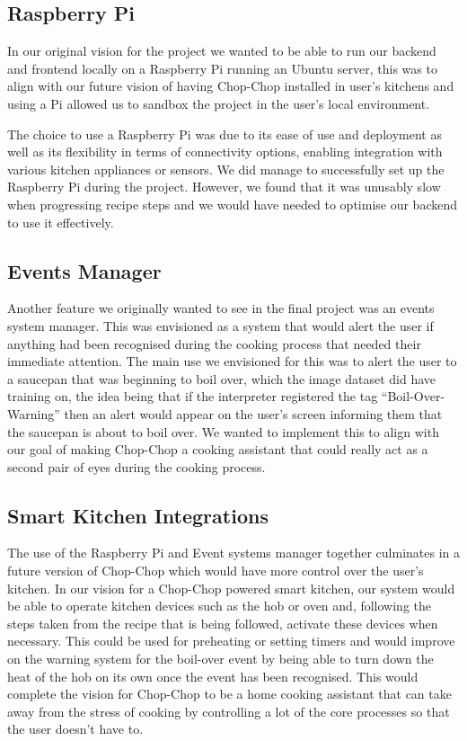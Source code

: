 \documentclass{article}
\begin{document}
\subsection{Raspberry Pi}
In our original vision for the project we wanted to be able to run our backend
and frontend locally on a Raspberry Pi running an Ubuntu server, this was to
align with our future vision of having Chop-Chop installed in user's kitchens
and using a Pi allowed us to sandbox the project in the user's local
environment.

The choice to use a Raspberry Pi was due to its ease of use and deployment as
well as its flexibility in terms of connectivity options, enabling integration
with various kitchen appliances or sensors. We did manage to successfully set
up the Raspberry Pi during the project. However, we found that it was unusably
slow when progressing recipe steps and we would have needed to optimise our
backend to use it effectively.
\subsection{Events Manager}
Another feature we originally wanted to see in the final project was an events
system manager. This was envisioned as a system that would alert the user if
anything had been recognised during the cooking process that needed their
immediate attention. The main use we envisioned for this was to alert the user
to a saucepan that was beginning to boil over, which the image dataset did have
training on, the idea being that if the interpreter registered the tag
“Boil-Over-Warning” then an alert would appear on the user’s screen informing
them that the saucepan is about to boil over. We wanted to implement this to
align with our goal of making Chop-Chop a cooking assistant that could really
act as a second pair of eyes during the cooking process.
\subsection{Smart Kitchen Integrations}
The use of the Raspberry Pi and Event systems manager together culminates in a
future version of Chop-Chop which would have more control over the user’s
kitchen. In our vision for a Chop-Chop powered smart kitchen, our system would
be able to operate kitchen devices such as the hob or oven and, following the
steps taken from the recipe that is being followed, activate these devices when
necessary. This could be used for preheating or setting timers and would
improve on the warning system for the boil-over event by being able to turn
down the heat of the hob on its own once the event has been recognised. This
would complete the vision for Chop-Chop to be a home cooking assistant that can
take away from the stress of cooking by controlling a lot of the core processes
so that the user doesn’t have to.
\end{document}
